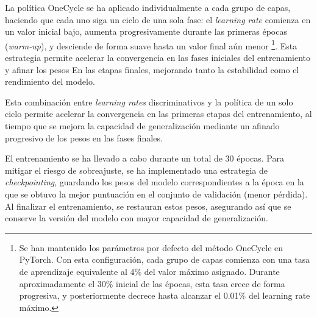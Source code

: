 La política OneCycle se ha aplicado individualmente a cada grupo de capas, haciendo que cada uno siga un ciclo de una sola fase: el \textit{learning rate} comienza en un valor inicial bajo, aumenta progresivamente durante las primeras épocas (\textit{warm-up}), y desciende de forma suave hasta un valor final aún menor%
\footnote{
    Se han mantenido los parámetros por defecto del método OneCycle en PyTorch. Con esta configuración, cada grupo de capas comienza con una tasa de aprendizaje equivalente al 4\% del valor máximo asignado. Durante aproximadamente el 30\% inicial de las épocas, esta tasa crece de forma progresiva, y posteriormente decrece hasta alcanzar el 0.01\% del learning rate máximo.
}. 
Esta estrategia permite acelerar la convergencia en las fases iniciales del entrenamiento y afinar los pesos En las etapas finales, mejorando tanto la estabilidad como el rendimiento del modelo.

Esta combinación entre \textit{learning rates} discriminativos y la política de un solo ciclo permite acelerar la convergencia en las primeras etapas del entrenamiento, al tiempo que se mejora la capacidad de generalización mediante un afinado progresivo de los pesos en las fases finales.

El entrenamiento se ha llevado a cabo durante un total de 30 épocas. Para mitigar el riesgo de sobreajuste, se ha implementado una estrategia de \textit{checkpointing}, guardando los pesos del modelo correspondientes a la época en la que se obtuvo la mejor puntuación en el conjunto de validación (menor pérdida). Al finalizar el entrenamiento, se restauran estos pesos, asegurando así que se conserve la versión del modelo con mayor capacidad de generalización.



